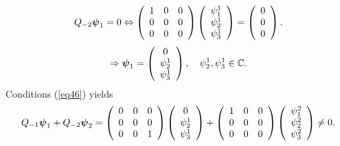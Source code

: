 \documentclass[11pt, reqno]{amsart}
\theoremstyle{plain}
\theoremstyle{remark}
\numberwithin{equation}{section}
\begin{document}
\begin{equation}\label{eq422}
Q_{-2}\boldsymbol{\psi}_{1}=0 \Leftrightarrow \left( {\begin{array}{*{20}c}
1 & 0 & 0\\
0 &  0 & 0\\
0 &  0 &0\\
\end{array} } \right)\left( {\begin{array}{*{20}c}
\psi_{1}^{1} \\
\psi_{2}^{1} \\
\psi_{3}^{1}\\
\end{array} } \right)=\left( {\begin{array}{*{20}c}
0 \\
0 \\
0\\
\end{array} } \right). 
\end{equation}
\[
\Rightarrow\boldsymbol{\psi}_{1}=\left( {\begin{array}{*{20}c}
0 \\
\psi_{2}^{1} \\
\psi_{3}^{1}\\
\end{array} } \right), \quad \psi_{2}^{1}, \psi_{3}^{1} \in \mathbb{C}.
\]
Conditions (\ref{eq46}) yields
\[
Q_{-1}\boldsymbol{\psi}_{1}+ Q_{-2}\boldsymbol{\psi}_{2}= \left( {\begin{array}{*{20}c}
0 & 0 & 0\\
0 &  0 & 0\\
0 &  0 & 1\\
\end{array} } \right)\left( {\begin{array}{*{20}c}
0 \\
\psi_{2}^{1} \\
\psi_{3}^{1}\\
\end{array} } \right)+\left( {\begin{array}{*{20}c}
1 & 0 & 0\\
0 &  0 & 0\\
0 &  0 & 0\\
\end{array} } \right)\left( {\begin{array}{*{20}c}
\psi_{1}^{2} \\
\psi_{2}^{2} \\
\psi_{3}^{2}\\
\end{array} } \right) \neq 0.
\]
\end{document}
